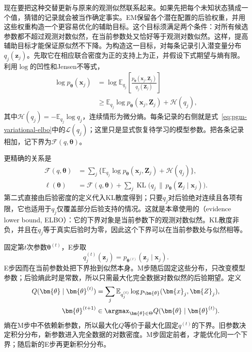 现在要把这种交替更新与原来的观测似然联系起来。如果先把每个未知状态猜成一个值，猜错的记录就会被当作确定事实。EM保留各个潜在配置的后验权重，并用这些权重构造一个更容易优化的辅助目标。这个目标须满足两个条件：对所有候选参数都不超过观测对数似然，在当前参数处又恰好等于观测对数似然。这样，提高辅助目标才能保证原似然不下降。为构造这一目标，对每条记录引入潜变量分布$q_j(\bm{z}_j)$。先取它在相应联合密度为正的支持上为正，并假设下式期望与熵有限。利用$\log$的凹性和Jensen不等式，
\begin{equation}
  \begin{aligned}
    \log p_{\bm{\theta}}(\bm{x}_j)
      &=\log\mathbb{E}_{q_j}
        \left[\frac{p_{\bm{\theta}}(\bm{x}_j,\bm{Z}_j)}
                    {q_j(\bm{Z}_j)}\right]\\
      &\geq
        \mathbb{E}_{q_j}\log p_{\bm{\theta}}
             (\bm{x}_j,\bm{Z}_j)+\mathcal{H}(q_j),
  \end{aligned}
  \label{eq:pgm-parameter-learning-jensen}
\end{equation}
其中$\mathcal{H}(q_j)=-\mathbb{E}_{q_j}\log q_j$，连续情形为微分熵。每条记录的右侧就是式~\eqref{eq:pgm-variational-elbo}中的$\mathcal{L}(q_j)$；这里只是显式恢复待学习的模型参数。把各条记录相加，记下界为$\mathcal{F}(q,\bm{\theta})$。

更精确的关系是
\begin{equation}
  \begin{aligned}
    \mathcal{F}(q,\bm{\theta})
      &=\sum_j\{\mathbb{E}_{q_j}
          \log p_{\bm{\theta}}(\bm{x}_j,\bm{Z}_j)
                      +\mathcal{H}(q_j)\},\\
    \ell(\bm{\theta})
      &=\mathcal{F}(q,\bm{\theta})
        +\sum_j\operatorname{KL}
          \bigl(q_j\,\|\,p_{\bm{\theta}}(\bm{Z}_j\mid\bm{x}_j)\bigr).
  \end{aligned}
  \label{eq:pgm-parameter-learning-elbo-identity}
\end{equation}
第二式直接由后验密度的定义代入KL散度得到；只要$q_j$对后验绝对连续且各项有限，它也适用于$q_j$仅覆盖部分后验支持的情况。这就是本章使用的（evidence lower bound, ELBO）：它的下界对象是当前参数下的观测对数似然。KL散度非负，并且在$q_j$等于真实后验时为零，因此这个下界可以在当前参数处与似然相等。

固定第$t$次参数$\bm{\theta}^{(t)}$，E步取
\[
  q_j^{(t)}(\bm{z}_j)
    =p_{\bm{\theta}^{(t)}}(\bm{z}_j\mid\bm{x}_j).
\]
E步因而在当前参数处把下界抬到似然本身。M步随后固定这些分布，只改变模型参数；后验熵此时是常数，所以只需最大化完全数据对数似然的后验期望。定义
\begin{equation}
  \begin{aligned}
    Q(\bm{\theta}\mid\bm{\theta}^{(t)})
      &=\sum_j\mathbb{E}_{q_j^{(t)}}
          \log p_{\bm{\theta}}(\bm{x}_j,\bm{Z}_j),\\
    \bm{\theta}^{(t+1)}
      &\in\argmax_{\bm{\theta}\in\Theta}
         Q(\bm{\theta}\mid\bm{\theta}^{(t)}).
  \end{aligned}
  \label{eq:pgm-parameter-learning-em-update}
\end{equation}
熵在M步中不依赖新参数，所以最大化$Q$等价于最大化固定$q^{(t)}$的下界。旧参数决定积分分布，新参数进入完全数据的对数密度。M步固定前者，才能优化同一个下界；随后新的E步再更新积分分布。

